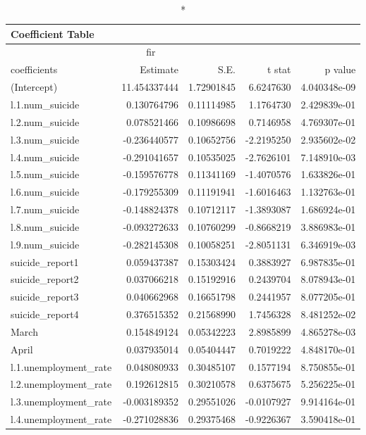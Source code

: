 \begin{longtable}{lrrrr}
\caption*{
{\large Coefficient Table}
} \\ 
\toprule
\multicolumn{4}{c}{fir} &  \\ 
\cmidrule(lr){1-4}
coefficients & Estimate & S.E. & t stat & p value \\ 
\midrule
(Intercept) & 11.454337444 & 1.72901845 & 6.6247630 & 4.040348e-09 \\ 
l.1.num\_suicide & 0.130764796 & 0.11114985 & 1.1764730 & 2.429839e-01 \\ 
l.2.num\_suicide & 0.078521466 & 0.10986698 & 0.7146958 & 4.769307e-01 \\ 
l.3.num\_suicide & -0.236440577 & 0.10652756 & -2.2195250 & 2.935602e-02 \\ 
l.4.num\_suicide & -0.291041657 & 0.10535025 & -2.7626101 & 7.148910e-03 \\ 
l.5.num\_suicide & -0.159576778 & 0.11341169 & -1.4070576 & 1.633826e-01 \\ 
l.6.num\_suicide & -0.179255309 & 0.11191941 & -1.6016463 & 1.132763e-01 \\ 
l.7.num\_suicide & -0.148824378 & 0.10712117 & -1.3893087 & 1.686924e-01 \\ 
l.8.num\_suicide & -0.093272633 & 0.10760299 & -0.8668219 & 3.886983e-01 \\ 
l.9.num\_suicide & -0.282145308 & 0.10058251 & -2.8051131 & 6.346919e-03 \\ 
suicide\_report1 & 0.059437387 & 0.15303424 & 0.3883927 & 6.987835e-01 \\ 
suicide\_report2 & 0.037066218 & 0.15192916 & 0.2439704 & 8.078943e-01 \\ 
suicide\_report3 & 0.040662968 & 0.16651798 & 0.2441957 & 8.077205e-01 \\ 
suicide\_report4 & 0.376515352 & 0.21568990 & 1.7456328 & 8.481252e-02 \\ 
March & 0.154849124 & 0.05342223 & 2.8985899 & 4.865278e-03 \\ 
April & 0.037935014 & 0.05404447 & 0.7019222 & 4.848170e-01 \\ 
l.1.unemployment\_rate & 0.048080933 & 0.30485107 & 0.1577194 & 8.750855e-01 \\ 
l.2.unemployment\_rate & 0.192612815 & 0.30210578 & 0.6375675 & 5.256225e-01 \\ 
l.3.unemployment\_rate & -0.003189352 & 0.29551026 & -0.0107927 & 9.914164e-01 \\ 
l.4.unemployment\_rate & -0.271028836 & 0.29375468 & -0.9226367 & 3.590418e-01 \\ 

\end{longtable}
